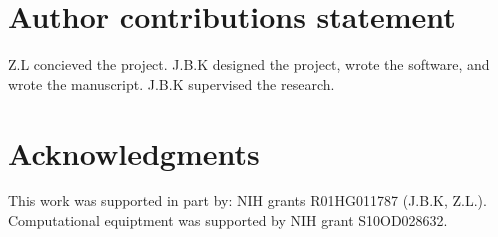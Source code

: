 \documentclass[unnumsec,webpdf,modern,large]{mam-authoring-template}%
\theoremstyle{thmstyleone}%
\theoremstyle{thmstyletwo}%
\theoremstyle{thmstylethree}%
\begin{document}
\section{Author contributions statement}
Z.L concieved the project. J.B.K designed the project, wrote the software, and wrote the manuscript. J.B.K supervised the research.

\section{Acknowledgments}
This work was supported in part by: NIH grants R01HG011787 (J.B.K, Z.L.). Computational equiptment was supported by NIH grant S10OD028632.


\end{document}

